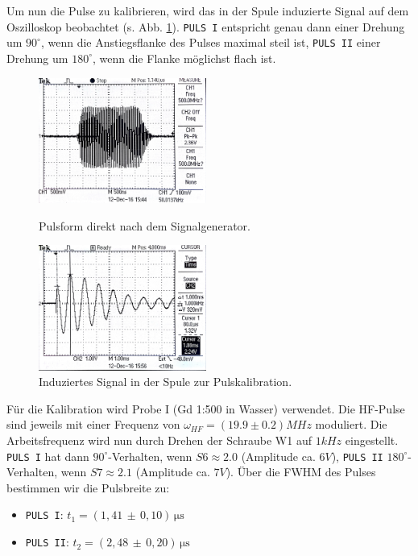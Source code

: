 \documentclass[a4paper]{scrartcl} %
\newcommand{\err}[2]{( #1 \, \pm \, #2 )} %
\newcommand{\us}{\, \mathrm{\mu s}}
\begin{document}
Um nun die Pulse zu kalibrieren, wird das in der Spule induzierte Signal auf dem Oszilloskop beobachtet (s. Abb. \ref{fig:pulse_induced}). \texttt{PULS I} entspricht genau dann einer Drehung um $90^\circ$, wenn die Anstiegsflanke des Pulses maximal steil ist, \texttt{PULS II} einer Drehung um $180^\circ$, wenn die Flanke möglichst flach ist.
\newline
\begin{figure}[H]
	\centering
	\parbox{60mm}{
		\centering
		\includegraphics[width=55mm]{./Resources/pulse_train.jpg}
		\caption{Pulsform direkt nach dem Signalgenerator.}
		\label{fig:pulse_signal}
	}
	\hfill  %
	\parbox{60mm}{
		\centering
		\includegraphics[width=55mm]{./Resources/single_pulse_event.jpg}
		\caption{Induziertes Signal in der Spule zur Pulskalibration.}
		\label{fig:pulse_induced}
	}
\end{figure}

Für die Kalibration wird Probe I (Gd 1:500 in Wasser) verwendet. Die HF-Pulse sind jeweils mit einer Frequenz von $\omega_{HF} = (19.9 \pm 0.2) MHz$ moduliert. Die Arbeitsfrequenz wird nun durch Drehen der Schraube W1 auf $1kHz$ eingestellt. \texttt{PULS I} hat dann $90^\circ$-Verhalten, wenn $S6 \approx 2.0$ (Amplitude ca. $6V$), \texttt{PULS II} $180^\circ$-Verhalten, wenn $S7 \approx 2.1$ (Amplitude ca. $7V$). Über die FWHM des Pulses bestimmen wir die Pulsbreite zu:
\begin{itemize}
	\item[] \texttt{PULS I}: $t_1=\err{1,41}{0,10}\us$
	\item[] \texttt{PULS II}: $t_2=\err{2,48}{0,20}\us$
\end{itemize}
\end{document}
